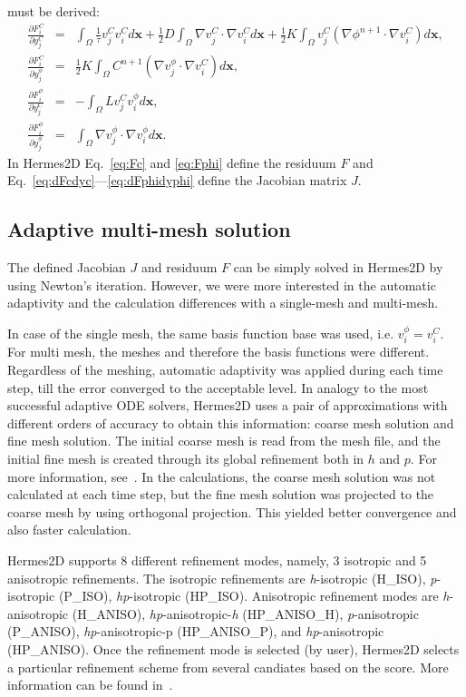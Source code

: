 must be derived: 
\begin{eqnarray}
  \frac{\partial F_i^C}{\partial y_j^C} &=& 
  \int_{\Omega} \frac{1}{\tau} v_j^C v_i^C d\mathbf{x} + 
  \frac 12 D\int_{\Omega} \nabla v_j^C \cdot \nabla v_i^C d\mathbf{x}
  + \frac 12 K\int_{\Omega} v_j^C \left(\nabla \phi^{n+1} \cdot \nabla v_i^C\right) d\mathbf{x},\label{eq:dFcdyc}\\
  \frac{\partial F_i^C}{\partial y_j^{\phi}} &=&
  \frac 12 K \int_{\Omega} C^{n+1} \left(\nabla v_j^{\phi} \cdot \nabla v_i^C\right) d\mathbf{x},\\
  \frac{\partial F_i^{\phi}}{\partial y_j^C} &=&
  - \int_{\Omega} L v_j^C v_i^{\phi} d\mathbf{x},\\
  \frac{\partial F_i^{\phi}}{\partial y_j^{\phi}} &=&
  \int_{\Omega} \nabla v_j^{\phi} \cdot \nabla v_i^{\phi} d\mathbf{x}\label{eq:dFphidyphi}.
\end{eqnarray}
In Hermes2D Eq.~\eqref{eq:Fc} and \eqref{eq:Fphi} define the residuum $F$ and
Eq.~\eqref{eq:dFcdyc}---\eqref{eq:dFphidyphi} define the Jacobian matrix $J$.

\subsection{Adaptive multi-mesh solution}

The defined Jacobian $J$ and residuum $F$ can be simply solved in Hermes2D by
using Newton's iteration. However, we were more interested in the automatic
adaptivity and the calculation differences with a single-mesh and multi-mesh.

In case of the single mesh, the same basis function base was used, i.e.
$v_i^\phi=v_i^C$. For multi mesh, the meshes and therefore the basis functions
were different. Regardless of the meshing, automatic adaptivity was applied
during each time step, till the error converged to the acceptable level.
In analogy to the most successful adaptive ODE solvers, Hermes2D uses a pair of 
approximations with different orders of accuracy to obtain this information: 
coarse mesh solution and fine mesh solution. The initial coarse mesh is read 
from the mesh file, and the initial fine mesh is created through its 
global refinement both in $h$ and $p$. For more
information, see~\cite{Hermes-project}. In the calculations, the coarse
mesh solution was not calculated at each time step, but the fine mesh
solution was projected to the coarse mesh by using orthogonal projection. This
yielded better convergence and also faster calculation.

Hermes2D supports 8 different refinement modes, namely,
3 isotropic and 5 anisotropic refinements. The isotropic refinements are
\emph{h}-isotropic (H\_ISO), \emph{p}-isotropic (P\_ISO), \emph{hp}-isotropic (HP\_ISO).
Anisotropic refinement modes are
\emph{h}-anisotropic (H\_ANISO),
\emph{hp}-anisotropic-\emph{h} (HP\_ANISO\_H), \emph{p}-anisotropic (P\_ANISO),
\emph{hp}-anisotropic-p (HP\_ANISO\_P), and \emph{hp}-anisotropic (HP\_ANISO).
Once the refinement mode is selected (by user), Hermes2D selects a particular
refinement scheme from several candiates based on the score. More information
can be found in~\cite{Hermes-project}.


